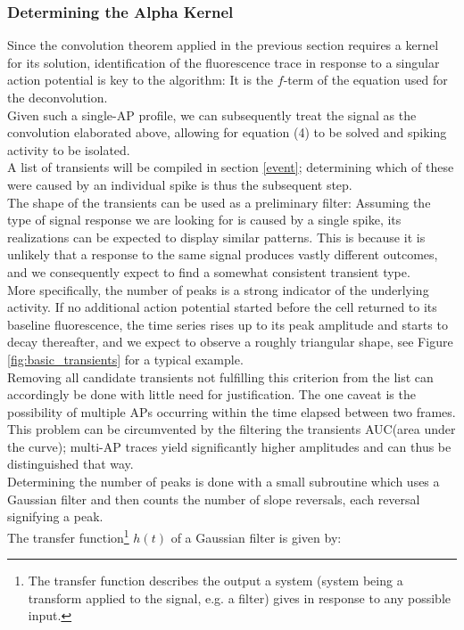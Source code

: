 \documentclass[titlepage]{article}
\begin{document}
\subsubsection{Determining the Alpha Kernel}\label{kernel}
Since the convolution theorem applied in the previous section requires a kernel for its solution, identification of the fluorescence trace in response to a singular action potential is key to the algorithm: It is the $f$-term of the equation used for the deconvolution.\\
Given such a single-AP profile, we can subsequently treat the signal as the convolution elaborated above, allowing for equation (4) to be solved and spiking activity to be isolated.\\ 
A list of transients will be compiled in section \ref{event}; determining which of these were caused by an individual spike is thus the subsequent step.\\
The shape of the transients can be used as a preliminary filter: Assuming the type of signal response we are looking for is caused by a single spike, its realizations can be expected to display similar patterns. This is because it is unlikely that a response to the same signal produces vastly different outcomes, and we consequently expect to find a somewhat consistent transient type.\\
More specifically, the number of peaks is a strong indicator of the underlying activity. If no additional action potential started before the cell returned to its baseline fluorescence, the time series rises up to its peak amplitude and starts to decay thereafter, and we expect to observe a roughly triangular shape, see Figure \ref{fig:basic_transients} for a typical example.\\
Removing all candidate transients not fulfilling this criterion from the list can accordingly be done with little need for justification. The one caveat is the possibility of multiple APs occurring within the time elapsed between two frames. This problem can be circumvented by the filtering the transients AUC(area under the curve); multi-AP traces yield significantly higher amplitudes and can thus be distinguished that way.\\
Determining the number of peaks is done with a small subroutine which uses a Gaussian filter and then counts the number of slope reversals, each reversal signifying a peak.\\
The transfer function\footnote{The transfer function describes the output a system (system being a transform applied to the signal, e.g. a filter) gives in response to any possible input.} $h(t)$ of a Gaussian filter is given by\cite{krystek_digitale_2004}:\\
\end{document}
